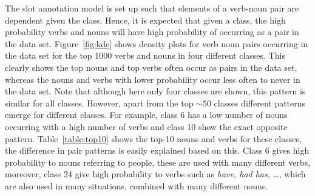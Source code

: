 \documentclass[11pt]{scrartcl}
\begin{document}
The slot annotation model is set up such that elements of a verb-noun
pair are dependent given the class. Hence, it is expected that given a
class, the high probability verbs and nouns will have high probability
of occurring as a pair in the data set. Figure~\ref{fig:kde} shows
density plots for verb noun pairs occurring in the data set for the
top 1000 verbs and nouns in four different classes. This clearly shows
the top nouns and top verbs often occur as pairs in the data set,
whereas the nouns and verbs with lower probability occur less often to
never in the data set. Note that although here only four classes are
shown, this pattern is similar for all classes. However, apart from
the top $\sim 50$ classes different patterns emerge for different
classes. For example, class 6 has a low number of nouns occurring with
a high number of verbs and class 10 show the exact opposite pattern.
Table~\ref{table:top10} shows the top-10 nouns and verbs for these
classes, the difference in pair patterns is easily explained based on
this. Class 6 gives high probability to nouns referring to people,
these are used with many different verbs, moreover, class 24 give high
probability to verbs such as \textit{have, had has, \ldots}, which are
also used in many situations, combined with many different nouns.
\end{document}
